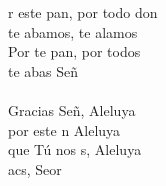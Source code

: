 \begin{cancion}%
	r este pan, por todo don\\
	te abamos, te alamos\\
	Por te pan, por todos\\
	te abas Señ \\
	\jump\\
	Gracias Señ, Aleluya \\
	por este n Aleluya\\
	que Tú nos s, Aleluya\\
	acs, Seor\\
\end{cancion}%
